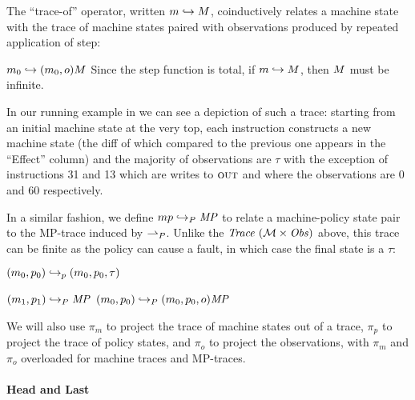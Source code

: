 \documentclass[acmsmall,review,anonymous]{acmart}\settopmatter{printfolios=true,printccs=false,printacmref=false}
\begin{document}
The ``trace-of'' operator, written \(m \hookrightarrow M\),
coinductively relates a machine state with the trace of machine states
paired with observations produced by repeated application of step:

            {\(m_0 \hookrightarrow (m_0,o) M\)}%
%
\noindent
Since the step function is total, if \(m \hookrightarrow M\),
then \(M\) must be infinite.

In our running example in  we can
see a depiction of such a trace: starting from an initial machine
state at the very top, each instruction constructs a new machine state
(the diff of which compared to the previous one appears in the
``Effect'' column) and the majority of observations are $\tau$ with
the exception of instructions 31 and 13 which are writes to $\textsc{out}$
and where the observations are $0$ and $60$ respectively.

In a similar fashion, we define \(mp \hookrightarrow_P \mathit{MP}\)
to relate a machine-policy state pair to the MP-trace
induced by \(\overset{}{\rightharpoonup}_P\). Unlike the $\mathit{Trace}~({\mathcal M} \times \mathit{Obs})$ above, this trace can
be finite as the policy can cause a fault, in which case the final state is
a \(\tau\):

\begin{minipage}{.4\textwidth}
         {\((m_0,p_0) \hookrightarrow_p (m_0,p_0,\tau)\)}
\end{minipage}
\begin{minipage}{.55\textwidth}
              {\((m_1,p_1) \hookrightarrow_P \mathit{MP}\)}
              {\((m_0,p_0) \hookrightarrow_P
                 (m_0,p_0,o) \mathit{MP}\)}
\end{minipage}

We will also use \(\pi_m\) to project the trace of machine states
out of a trace, \(\pi_p\) to project the trace of policy states, and
\(\pi_o\) to project the observations, with \(\pi_m\) and \(\pi_o\) overloaded
for machine traces and MP-traces.

\paragraph*{Head and Last}
\end{document}
